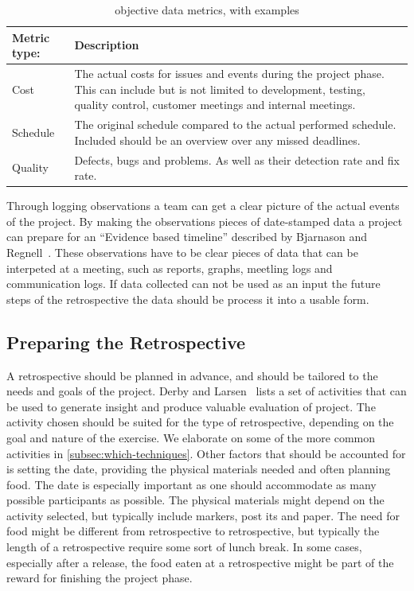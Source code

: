\documentclass[12pt]{article}
\begin{document}
\begin{table}[!h]
	\centering
	\captionsetup{justification=centering}
	\caption{objective data metrics, with examples}
	\label{table:objective_data_metrics}
	\begin{tabular}{| l | p{} |}
		\hline
		Metric type: & Description \\ \hline
		Cost & The actual costs for issues and events during the project phase. This can include but is not limited to development, testing, quality control, customer meetings and internal meetings. \\ \hline
		Schedule & The original schedule compared to the actual performed schedule. Included should be an overview over any missed deadlines. \\ \hline
		Quality & Defects, bugs and problems. As well as their detection rate and fix rate. \\   
		\hline
	\end{tabular}
\end{table}

Through logging observations a team can get a clear picture of the actual events of the project. By making the observations pieces of date-stamped data a project can prepare for an ``Evidence based timeline'' described by Bjarnason and Regnell~\cite{Bjarnason2012}. These observations have to be clear pieces of data that can be interpeted at a meeting, such as reports, graphs, meetling logs and communication logs. If data collected can not be used as an input the future steps of the retrospective the data should be process it into a usable form. 

\subsection{Preparing the Retrospective}
A retrospective should be planned in advance, and should be tailored to the needs and goals of the project. Derby and Larsen~\cite{Derby2007} lists a set of activities that can be used to generate insight and produce valuable evaluation of project. The activity chosen should be suited for the type of retrospective, depending on the goal and nature of the exercise. We elaborate on some of the more common activities in \autoref{subsec:which-techniques}. Other factors that should be accounted for is setting the date, providing the physical materials needed and often planning food. The date is especially important as one should accommodate as many possible participants as possible. The physical materials might depend on the activity selected, but typically include markers, post its and paper. The need for food might be different from retrospective to retrospective, but typically the length of a retrospective require some sort of lunch break. In some cases, especially after a release, the food eaten at a retrospective might be part of the reward for finishing the project phase.
\end{document}
